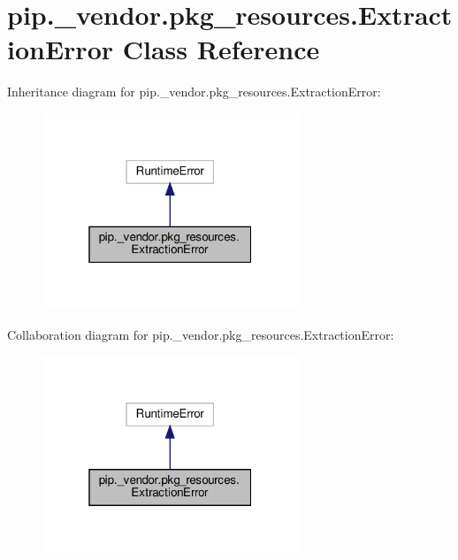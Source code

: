 \hypertarget{classpip_1_1__vendor_1_1pkg__resources_1_1ExtractionError}{}\section{pip.\+\_\+vendor.\+pkg\+\_\+resources.\+Extraction\+Error Class Reference}
\label{classpip_1_1__vendor_1_1pkg__resources_1_1ExtractionError}


Inheritance diagram for pip.\+\_\+vendor.\+pkg\+\_\+resources.\+Extraction\+Error\+:
\nopagebreak
\begin{figure}[H]
\begin{center}
\leavevmode
\includegraphics[width=217pt]{classpip_1_1__vendor_1_1pkg__resources_1_1ExtractionError__inherit__graph}
\end{center}
\end{figure}


Collaboration diagram for pip.\+\_\+vendor.\+pkg\+\_\+resources.\+Extraction\+Error\+:
\nopagebreak
\begin{figure}[H]
\begin{center}
\leavevmode
\includegraphics[width=217pt]{classpip_1_1__vendor_1_1pkg__resources_1_1ExtractionError__coll__graph}
\end{center}
\end{figure}


